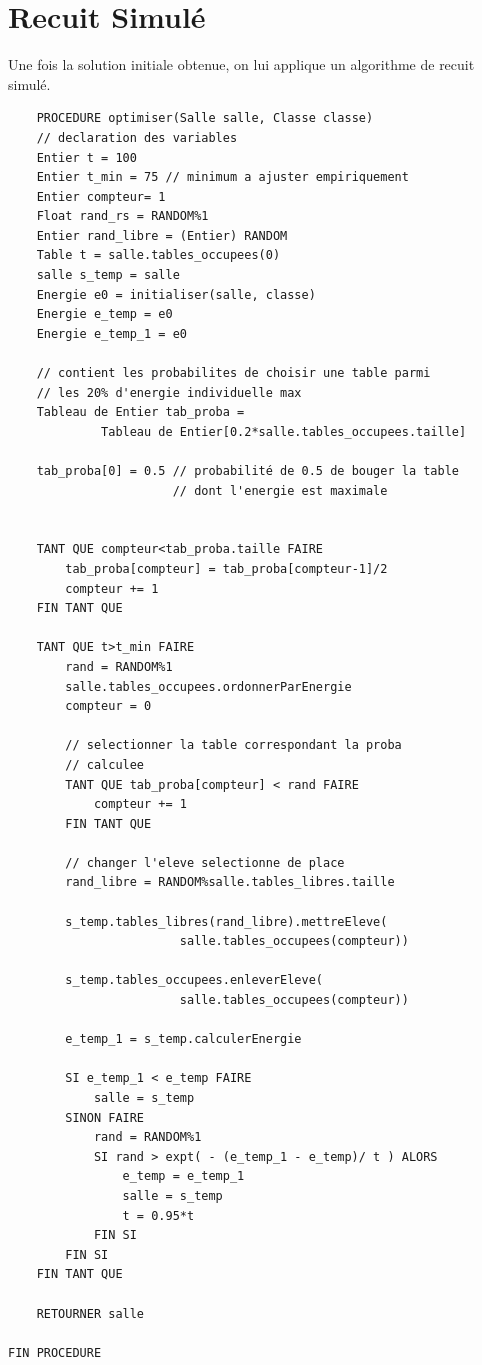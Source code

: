 \documentclass[11pt,a4paper, openany]{book}
\begin{document}
\section{Recuit Simulé}
\label{recuit}

Une fois la solution initiale obtenue, on lui applique un algorithme de recuit simulé.

\begin{verbatim}
    PROCEDURE optimiser(Salle salle, Classe classe)
    // declaration des variables
    Entier t = 100
    Entier t_min = 75 // minimum a ajuster empiriquement
    Entier compteur= 1
    Float rand_rs = RANDOM%1
    Entier rand_libre = (Entier) RANDOM
    Table t = salle.tables_occupees(0)
    salle s_temp = salle
    Energie e0 = initialiser(salle, classe)
    Energie e_temp = e0
    Energie e_temp_1 = e0
    
    // contient les probabilites de choisir une table parmi
    // les 20% d'energie individuelle max
    Tableau de Entier tab_proba = 
             Tableau de Entier[0.2*salle.tables_occupees.taille]
    
    tab_proba[0] = 0.5 // probabilité de 0.5 de bouger la table
                       // dont l'energie est maximale
    
    
    TANT QUE compteur<tab_proba.taille FAIRE
        tab_proba[compteur] = tab_proba[compteur-1]/2
        compteur += 1
    FIN TANT QUE
    
    TANT QUE t>t_min FAIRE
        rand = RANDOM%1
        salle.tables_occupees.ordonnerParEnergie
        compteur = 0
        
        // selectionner la table correspondant la proba
        // calculee
        TANT QUE tab_proba[compteur] < rand FAIRE
            compteur += 1
        FIN TANT QUE
        
        // changer l'eleve selectionne de place
        rand_libre = RANDOM%salle.tables_libres.taille
        
        s_temp.tables_libres(rand_libre).mettreEleve(
                        salle.tables_occupees(compteur))
                        
        s_temp.tables_occupees.enleverEleve(
                        salle.tables_occupees(compteur))
        
        e_temp_1 = s_temp.calculerEnergie
        
        SI e_temp_1 < e_temp FAIRE
            salle = s_temp
        SINON FAIRE
            rand = RANDOM%1
            SI rand > expt( - (e_temp_1 - e_temp)/ t ) ALORS
                e_temp = e_temp_1
                salle = s_temp
                t = 0.95*t
            FIN SI
        FIN SI
    FIN TANT QUE
    
    RETOURNER salle
    
FIN PROCEDURE
            
        
        
        
    
\end{verbatim}
\end{document}
